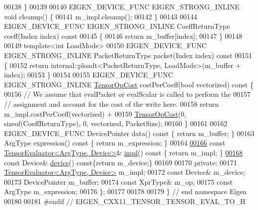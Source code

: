 \begin{DoxyCode}
00138   \}
00139 
00140   EIGEN\_DEVICE\_FUNC EIGEN\_STRONG\_INLINE \textcolor{keywordtype}{void} cleanup() \{
00141     m\_impl.cleanup();
00142   \}
00143 
00144   EIGEN\_DEVICE\_FUNC EIGEN\_STRONG\_INLINE CoeffReturnType coeff(Index index)\textcolor{keyword}{ const}
00145 \textcolor{keyword}{  }\{
00146     \textcolor{keywordflow}{return} m\_buffer[index];
00147   \}
00148 
00149   \textcolor{keyword}{template}<\textcolor{keywordtype}{int} LoadMode>
00150   EIGEN\_DEVICE\_FUNC EIGEN\_STRONG\_INLINE PacketReturnType packet(Index index)\textcolor{keyword}{ const}
00151 \textcolor{keyword}{  }\{
00152     \textcolor{keywordflow}{return} internal::ploadt<PacketReturnType, LoadMode>(m\_buffer + index);
00153   \}
00154 
00155   EIGEN\_DEVICE\_FUNC EIGEN\_STRONG\_INLINE \hyperlink{class_eigen_1_1_tensor_op_cost}{TensorOpCost} costPerCoeff(\textcolor{keywordtype}{bool} vectorized)\textcolor{keyword}{ const }\{
00156     \textcolor{comment}{// We assume that evalPacket or evalScalar is called to perform the}
00157     \textcolor{comment}{// assignment and account for the cost of the write here.}
00158     \textcolor{keywordflow}{return} m\_impl.costPerCoeff(vectorized) +
00159         \hyperlink{class_eigen_1_1_tensor_op_cost}{TensorOpCost}(0, \textcolor{keyword}{sizeof}(CoeffReturnType), 0, vectorized, PacketSize);
00160   \}
00161 
00162   EIGEN\_DEVICE\_FUNC DevicePointer data()\textcolor{keyword}{ const }\{ \textcolor{keywordflow}{return} m\_buffer; \}
00163   ArgType expression()\textcolor{keyword}{ const }\{ \textcolor{keywordflow}{return} m\_expression; \}
00164 
\hyperlink{struct_eigen_1_1_tensor_evaluator_3_01const_01_tensor_eval_to_op_3_01_arg_type_00_01_make_pointer___01_4_00_01_device_01_4_a29fc7dbf9a2957f1e2ece1b2bdf33159}{00166}   \textcolor{keyword}{const} \hyperlink{struct_eigen_1_1_tensor_evaluator}{TensorEvaluator<ArgType, Device>}& \hyperlink{struct_eigen_1_1_tensor_evaluator_3_01const_01_tensor_eval_to_op_3_01_arg_type_00_01_make_pointer___01_4_00_01_device_01_4_a29fc7dbf9a2957f1e2ece1b2bdf33159}{impl}()\textcolor{keyword}{ const }\{ \textcolor{keywordflow}{return} m\_impl;
       \}
\hyperlink{struct_eigen_1_1_tensor_evaluator_3_01const_01_tensor_eval_to_op_3_01_arg_type_00_01_make_pointer___01_4_00_01_device_01_4_a6a4c3f1f7993a251f2bd46b9c4498e2f}{00168}   \textcolor{keyword}{const} Device& \hyperlink{struct_eigen_1_1_tensor_evaluator_3_01const_01_tensor_eval_to_op_3_01_arg_type_00_01_make_pointer___01_4_00_01_device_01_4_a6a4c3f1f7993a251f2bd46b9c4498e2f}{device}()\textcolor{keyword}{ const}\{\textcolor{keywordflow}{return} m\_device;\}
00169 
00170  \textcolor{keyword}{private}:
00171   \hyperlink{struct_eigen_1_1_tensor_evaluator}{TensorEvaluator<ArgType, Device>} m\_impl;
00172   \textcolor{keyword}{const} Device& m\_device;
00173   DevicePointer m\_buffer;
00174   \textcolor{keyword}{const} XprType& m\_op;
00175   \textcolor{keyword}{const} ArgType m\_expression;
00176 \};
00177 
00178 
00179 \} \textcolor{comment}{// end namespace Eigen}
00180 
00181 \textcolor{preprocessor}{#endif // EIGEN\_CXX11\_TENSOR\_TENSOR\_EVAL\_TO\_H}
\end{DoxyCode}
